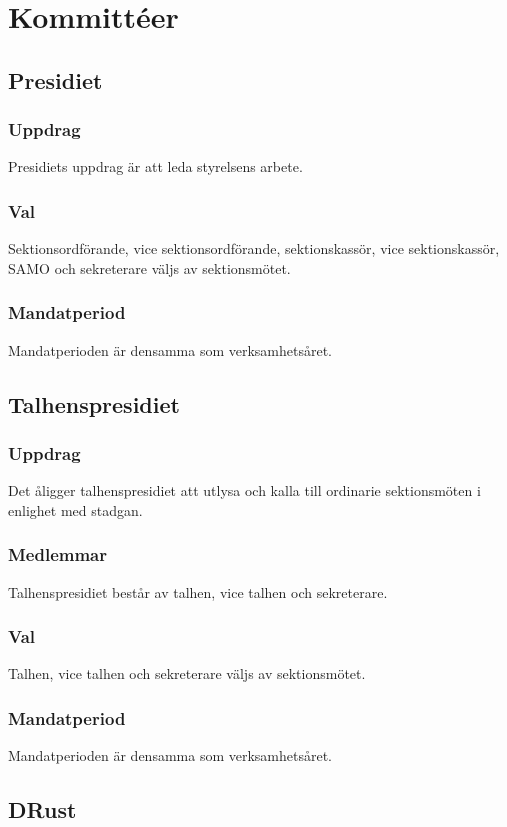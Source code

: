 \section{Kommittéer}

\subsection{Presidiet}
\subsubsection{Uppdrag}
Presidiets uppdrag är att leda styrelsens arbete.

\subsubsection{Val}
Sektionsordförande, vice sektionsordförande, sektionskassör, vice sektionskassör, SAMO och sekreterare väljs av sektionsmötet.

\subsubsection{Mandatperiod}
Mandatperioden är densamma som verksamhetsåret.

\subsection{Talhenspresidiet}
\subsubsection{Uppdrag}
Det åligger talhenspresidiet att utlysa och kalla till ordinarie sektionsmöten i enlighet med stadgan.
\subsubsection{Medlemmar}
Talhenspresidiet består av talhen, vice talhen och sekreterare.
\subsubsection{Val}
Talhen, vice talhen och sekreterare väljs av sektionsmötet.
\subsubsection{Mandatperiod}
Mandatperioden är densamma som verksamhetsåret.

\subsection{DRust}
